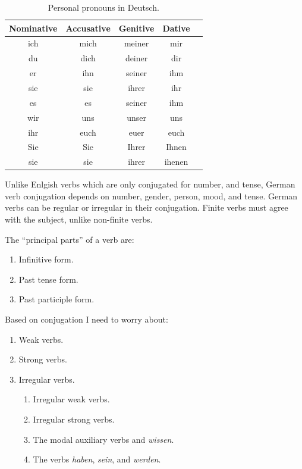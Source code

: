\documentclass[a4paper]{article}
\begin{document}
\begin{table}[hbt!]
    \centering
    \begin{tabular}{ c c c c c }
        Nominative & Accusative & Genitive & Dative \\
        \hline
        ich        & mich       & meiner   & mir    \\
        du         & dich       & deiner   & dir    \\
        er         & ihn        & seiner   & ihm    \\
        sie        & sie        & ihrer    & ihr    \\
        es         & es         & seiner   & ihm    \\
        wir        & uns        & unser    & uns    \\
        ihr        & euch       & euer     & euch   \\
        Sie        & Sie        & Ihrer    & Ihnen  \\
        sie        & sie        & ihrer    & ihenen \\
        \hline
    \end{tabular}
    \caption{Personal pronouns in Deutsch.}
\end{table}


Unlike Enlgish verbs which are only conjugated for number, and tense, German verb conjugation depends on number, gender, 
person, mood, and tense. German verbs can be regular or irregular in their conjugation. Finite verbs must agree with
the subject, unlike non-finite verbs.

The ``principal parts'' of a verb are:
\begin{enumerate}
    \item Infinitive form.
    \item Past tense form.
    \item Past participle form.
\end{enumerate}

Based on conjugation I need to worry about:

\begin{enumerate}
    \item Weak verbs.
    \item Strong verbs.
    \item Irregular verbs.
          \begin{enumerate}
              \item Irregular weak verbs.
              \item Irregular strong verbs.
              \item The modal auxiliary verbs and \emph{wissen}.
              \item The verbs \emph{haben}, \emph{sein}, and \emph{werden}.
          \end{enumerate}
\end{enumerate}
\end{document}
